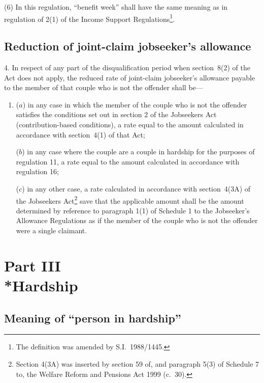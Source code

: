 \documentclass[12pt,a4paper]{article}
\begin{document}
(6) In this regulation, “benefit week” shall have the same meaning as in regulation of 2(1) of the Income Support Regulations\footnote{The definition was amended by S.I.~1988/1445.}.

\subsection[4. Reduction of joint-claim jobseeker’s allowance]{Reduction of joint-claim jobseeker’s allowance}

4.  In respect of any part of the disqualification period when section~8(2) of the Act does not apply, the reduced rate of joint-claim jobseeker’s allowance payable to the member of that couple who is not the offender shall be—
\begin{enumerate}\item[]
($a$) in any case in which the member of the couple who is not the offender satisfies the conditions set out in section 2 of the Jobseekers Act (contribution-based conditions), a rate equal to the amount calculated in accordance with section~4(1) of that Act;

($b$) in any case where the couple are a couple in hardship for the purposes of regulation 11, a rate equal to the amount calculated in accordance with regulation 16;

($c$) in any other case, a rate calculated in accordance with section~4(3A) of the Jobseekers Act\footnote{Section 4(3A) was inserted by section 59 of, and paragraph 5(3) of Schedule 7 to, the Welfare Reform and Pensions Act 1999 (c.~30).} save that the applicable amount shall be the amount determined by reference to paragraph 1(1) of Schedule 1 to the Jobseeker’s Allowance Regulations as if the member of the couple who is not the offender were a single claimant.
\end{enumerate}

\section[Part III --- Hardship]{Part III\\*Hardship}

\renewcommand\parthead{--- Part III}

\subsection[5. Meaning of “person in hardship”]{Meaning of “person in hardship”}
\end{document}
